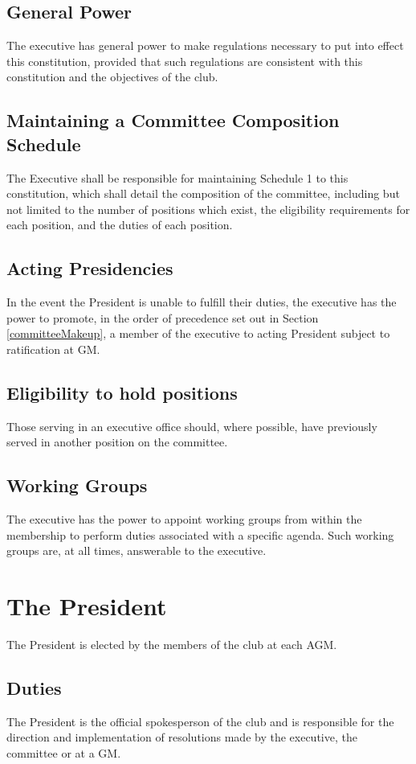 \documentclass[11pt]{article}
\begin{document}
\subsection{General Power}
The executive has general power to make regulations necessary to put into effect this constitution, provided that such regulations are consistent with this constitution and the objectives of the club.

\subsection{Maintaining a Committee Composition Schedule}
The Executive shall be responsible for maintaining Schedule 1 to this constitution, which shall detail the composition of the committee, including but not limited to the number of positions which exist, the eligibility requirements for each position, and the duties of each position.

\subsection{Acting Presidencies}
In the event the President is unable to fulfill their duties, the executive has the power to promote, in the order of precedence set out in Section \ref{committeeMakeup}, a member of the executive to acting President subject to ratification at GM.

\subsection{Eligibility to hold positions}
Those serving in an executive office should, where possible, have previously served in another position on the committee.

\subsection{Working Groups}
The executive has the power to appoint working groups from within the membership to perform duties associated with a specific agenda. Such working groups are, at all times, answerable to the executive.

\section{The President}
The President is elected by the members of the club at each AGM.
\subsection{Duties}
The President is the official spokesperson of the club and is responsible for the direction and implementation of resolutions made by the executive, the committee or at a GM.
\end{document}
